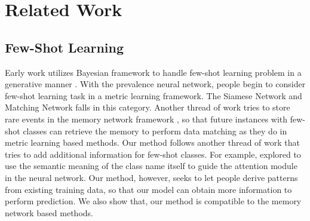 \section{Related Work}
\subsection{Few-Shot Learning}
Early work utilizes Bayesian framework to handle few-shot learning problem in a generative manner \cite{fei2006one}. With the prevalence neural network, people begin to consider few-shot learning task in a metric learning framework. The Siamese Network \cite{koch2015siamese} and Matching Network \cite{vinyals2016matching} falls in this category. Another thread of work tries to store rare events in the memory network framework \cite{santoro2016meta, kaiser2017learning}, so that future instances with few-shot classes can retrieve the memory to perform data matching as they do in metric learning based methods.
Our method follows another thread of work that tries to add additional information for few-shot classes. For example, \cite{wang2017multi} explored to use the semantic meaning of the class name itself to guide the attention module in the neural network. Our method, however, seeks to let people derive \RE patterns from existing training data, so that our model can obtain more information to perform prediction. We also show that, our method is compatible to the memory network based methods.


